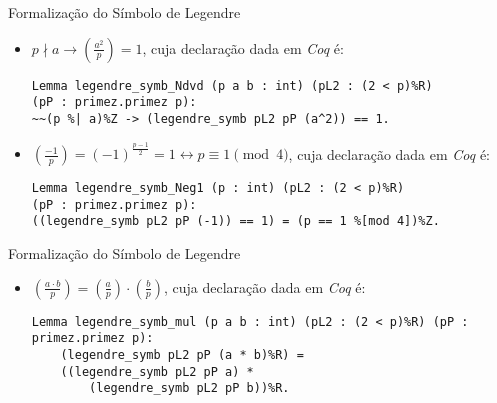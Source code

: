 \begin{frame}[fragile]{Formalização do Símbolo de Legendre}

    \begin{itemize}
        \item $p \nmid a \rightarrow \left(\frac{a^2}{p}\right) = 1$, cuja declaração dada em \textit{Coq} é:
        \newline
            \begin{lstlisting}[language=coq,frame=single,tabsize=1]
Lemma legendre_symb_Ndvd (p a b : int) (pL2 : (2 < p)%R) 
(pP : primez.primez p):
~~(p %| a)%Z -> (legendre_symb pL2 pP (a^2)) == 1.
            \end{lstlisting}

        \item $\left(\frac{-1}{p}\right) = (-1)^{\frac{p - 1}{2}} = 1 \leftrightarrow p \equiv 1 \pmod{4}$, cuja declaração dada em \textit{Coq} é:
        \newline
            \begin{lstlisting}[language=coq,frame=single,tabsize=1]
Lemma legendre_symb_Neg1 (p : int) (pL2 : (2 < p)%R) 
(pP : primez.primez p):
((legendre_symb pL2 pP (-1)) == 1) = (p == 1 %[mod 4])%Z.
            \end{lstlisting}

    \end{itemize}

\end{frame}

\begin{frame}[fragile]{Formalização do Símbolo de Legendre}

    \begin{itemize}
        \item $\left(\frac{a \cdot b}{p}\right) = \left(\frac{a}{p}\right) \cdot \left(\frac{b}{p}\right)$, cuja declaração dada em \textit{Coq} é:
        \newline
            \begin{lstlisting}[language=coq,frame=single,tabsize=1]
Lemma legendre_symb_mul (p a b : int) (pL2 : (2 < p)%R) (pP : primez.primez p):
    (legendre_symb pL2 pP (a * b)%R) = 
    ((legendre_symb pL2 pP a) * 
        (legendre_symb pL2 pP b))%R.
            \end{lstlisting}
    \end{itemize}

\end{frame}

